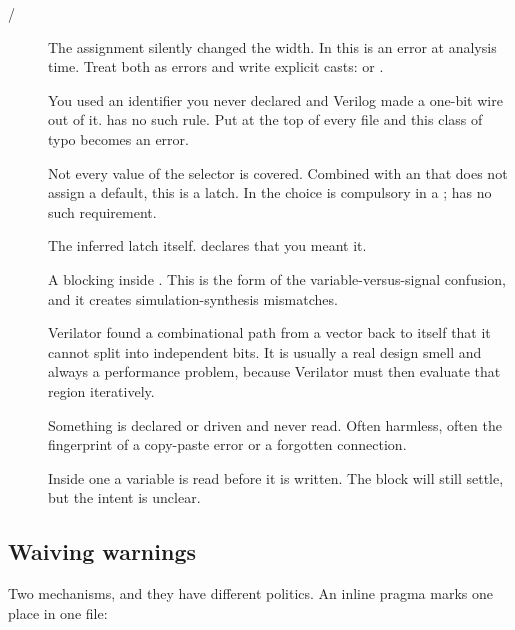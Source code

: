 \begin{description}
  \item[ / ] The assignment silently
        changed the width. In \VHDL{} this is an error at analysis time. Treat
        both as errors and write explicit casts:
         or .
  \item[] You used an identifier you never declared and Verilog
        made a one-bit wire out of it. \VHDL{} has no such rule. Put
         at the top of every file and this class
        of typo becomes an error.
  \item[] Not every value of the selector is covered.
        Combined with an  that does not assign a default,
        this is a latch. In \VHDL{} the  choice is compulsory in a
        ; \SV{} has no such requirement.
  \item[] The inferred latch itself.  declares
        that you meant it.
  \item[] A blocking \code{=} inside . This is
        the \SV{} form of the \VHDL{} variable-versus-signal confusion, and it
        creates simulation-synthesis mismatches.
  \item[] Verilator found a combinational path from a vector
        back to itself that it cannot split into independent bits. It is
        usually a real design smell and always a performance problem, because
        Verilator must then evaluate that region iteratively.
  \item[] Something is declared or driven and never read.
        Often harmless, often the fingerprint of a copy-paste error or a
        forgotten connection.
  \item[] Inside one  a variable is read
        before it is written. The block will still settle, but the intent is
        unclear.
\end{description}

\subsection{Waiving warnings}

Two mechanisms, and they have different
politics. An inline pragma marks one place in one file:

